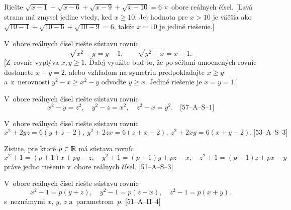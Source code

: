 {
Riešte $\sqrt{x-1}+\sqrt{x-6}+\sqrt{x-9}+\sqrt{x-10}=6$  v~obore reálnych čísel.
[Ľavá strana má zmysel jedine vtedy, keď $x\ge10$. Jej hodnota pre
$x>10$ je väčšia ako $\sqrt{10-1}+\sqrt{10-6}+\sqrt{10-9}=6$, takže
$x=10$ je jediné riešenie.]

V~obore reálnych čísel riešte sústavu rovníc
$$
\sqrt{x^2-y}=y-1,\qquad\sqrt{y^2-x}=x-1.
$$
[Z~rovníc vyplýva $x,y\ge1$. Ďalej využite buď to,
že po sčítaní umocnených rovníc dostanete $x+y=2$, alebo vzhľadom
na symetriu predpokladajte $x\ge y$ a~z~nerovnosti
$y^2-x\ge x^2-y$ odvoďte $y\ge x$. Jediné riešenie je $x=y=1$.]

\D
V~obore reálnych čísel riešte sústavu rovníc
$$
x^2-y=z^2,\quad
y^2-z=x^2,\quad
z^2-x=y^2.\quad\text{[57--A--S--1]}
$$

V~obore reálnych čísel riešte sústavu rovníc
$$
x^2+2yz=6(y+z-2),\
y^2+2zx=6(z+x-2),\
z^2+2xy=6(x+y-2).\ \text{[53--A--S--3]}
$$

Zistite, pre ktoré $p\in\Bbb R$ má sústava rovníc
$$
x^2+1=(p+1)x+py-z,\quad
y^2+1=(p+1)y+pz-x,\quad
z^2+1=(p+1)z+px-y
$$
práve jedno riešenie v~obore reálnych čísel. [51--A--S--3]

V~obore reálnych čísel riešte sústavu rovníc
$$
x^2-1=p(y+z),\quad
y^2-1=p(z+x),\quad
z^2-1=p(x+y).
$$
s~neznámymi $x$, $y$, $z$ a~parametrom~$p$. [51--A--II--4]
}

